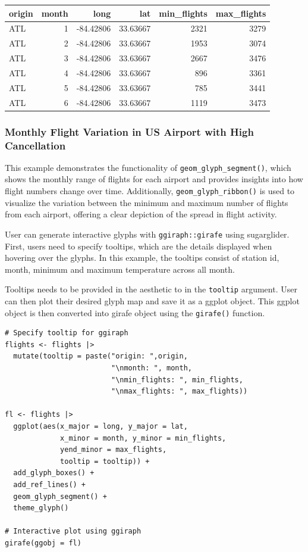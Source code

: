 \begin{table}
\centering
\begin{tabular}{l|r|r|r|r|r}
\hline
origin & month & long & lat & min\_flights & max\_flights\\
\hline
ATL & 1 & -84.42806 & 33.63667 & 2321 & 3279\\
\hline
ATL & 2 & -84.42806 & 33.63667 & 1953 & 3074\\
\hline
ATL & 3 & -84.42806 & 33.63667 & 2667 & 3476\\
\hline
ATL & 4 & -84.42806 & 33.63667 & 896 & 3361\\
\hline
ATL & 5 & -84.42806 & 33.63667 & 785 & 3441\\
\hline
ATL & 6 & -84.42806 & 33.63667 & 1119 & 3473\\
\hline
\end{tabular}
\end{table}

\subsubsection{Monthly Flight Variation in US Airport with High Cancellation}\label{monthly-flight-variation-in-us-airport-with-high-cancellation}

This example demonstrates the functionality of \texttt{geom\_glyph\_segment()}, which shows the monthly range of flights for each airport and provides insights into how flight numbers change over time. Additionally, \texttt{geom\_glyph\_ribbon()} is used to visualize the variation between the minimum and maximum number of flights from each airport, offering a clear depiction of the spread in flight activity.

User can generate interactive glyphs with \texttt{ggiraph::girafe} using sugarglider. First, users need to specify tooltips, which are the details displayed when hovering over the glyphs. In this example, the tooltips consist of station id, month, minimum and maximum temperature across all month.

Tooltips needs to be provided in the aesthetic to in the \texttt{tooltip} argument. User can then plot their desired glyph map and save it as a ggplot object. This ggplot object is then converted into girafe object using the \texttt{girafe()} function.

\begin{verbatim}
# Specify tooltip for ggiraph 
flights <- flights |>
  mutate(tooltip = paste("origin: ",origin,
                         "\nmonth: ", month,
                         "\nmin_flights: ", min_flights,
                         "\nmax_flights: ", max_flights))

fl <- flights |> 
  ggplot(aes(x_major = long, y_major = lat,
             x_minor = month, y_minor = min_flights,
             yend_minor = max_flights,
             tooltip = tooltip)) + 
  add_glyph_boxes() +
  add_ref_lines() +
  geom_glyph_segment() +
  theme_glyph()

# Interactive plot using ggiraph
girafe(ggobj = fl)
\end{verbatim}

